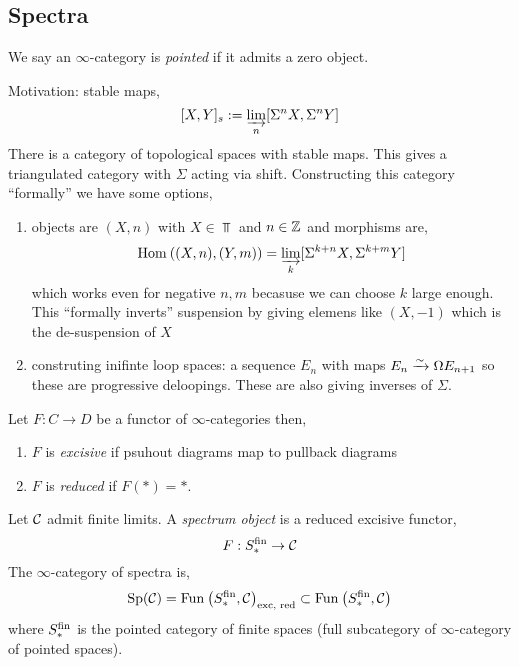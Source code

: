 \documentclass[12pt]{article}
\begin{document}
\newcommand{\dlim}{\varinjlim}
\newcommand{\ilim}{\varprojlim}
\newcommand{\plim}{\varprojlim}

\subsection{Spectra}

\begin{defn}
We say an $\infty$-category is \textit{pointed} if it admits a zero object. 
\end{defn}

Motivation: stable maps,
\[ [X, Y]_s : = \varinjlim_n [\Sigma^n X, \Sigma^n Y] \]
There is a category of topological spaces with stable maps. This gives a triangulated category with $\Sigma$ acting via shift. Constructing this category ``formally'' we have some options,
\begin{enumerate}
\item objects are $(X, n)$ with $X \in \Top$ and $n \in \mathbb{Z}$ and morphisms are,
\[ \Hom{}{(X, n)}{(Y, m)} = \dlim_k [\Sigma^{k+n} X, \Sigma^{k+m} Y] \]
which works even for negative $n, m$ becasuse we can choose $k$ large enough. This ``formally inverts'' suspension by giving elemens like $(X, -1)$ which is the de-suspension of $X$

\item construting inifinte loop spaces: a sequence $E_n$ with maps $E_n \xrightarrow{\sim} \Omega E_{n+1}$ so these are progressive deloopings. These are also giving inverses of $\Sigma$.
\end{enumerate}

\begin{defn}
Let $F : C \to D$ be a functor of $\infty$-categories then,
\begin{enumerate}
\item $F$ is \textit{excisive} if psuhout diagrams map to pullback diagrams
\item $F$ is \textit{reduced} if $F(*) = *$. 
\end{enumerate}
\end{defn}

\begin{defn}
Let $\mathcal{C}$ admit finite limits. A \textit{spectrum object} is a reduced excisive functor,
\[ F : S^{\mathrm{fin}}_* \to \mathcal{C} \]
The $\infty$-category of spectra is,
\[ \mathrm{Sp}(\mathcal{C}) = \mathrm{Fun}_{}\left(S^{\mathrm{fin}}_*, \mathcal{C}\right)_{\text{exc, red}} \subset \mathrm{Fun}_{}\left(S^{\mathrm{fin}}_*, \mathcal{C}\right) \]
where $S^{\mathrm{fin}}_*$ is the pointed category of finite spaces (full subcategory of $\infty$-category of pointed spaces). 
\end{defn}
\end{document}
